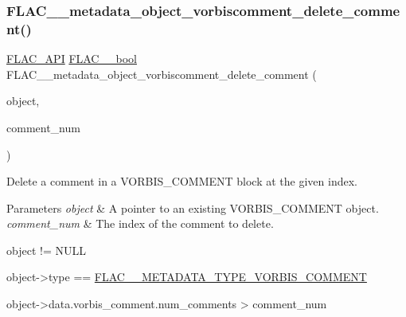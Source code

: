 \subsubsection{\texorpdfstring{F\+L\+A\+C\+\_\+\+\_\+metadata\+\_\+object\+\_\+vorbiscomment\+\_\+delete\+\_\+comment()}{FLAC\_\_metadata\_object\_vorbiscomment\_delete\_comment()}}
{\footnotesize\ttfamily \hyperlink{group__flac__export_ga56ca07df8a23310707732b1c0007d6f5}{F\+L\+A\+C\+\_\+\+A\+PI} \hyperlink{ordinals_8h_a95103469f1cbd78b8cf250194985b34e}{F\+L\+A\+C\+\_\+\+\_\+bool} F\+L\+A\+C\+\_\+\+\_\+metadata\+\_\+object\+\_\+vorbiscomment\+\_\+delete\+\_\+comment (\begin{DoxyParamCaption}\item[{\hyperlink{struct_f_l_a_c_____stream_metadata}{F\+L\+A\+C\+\_\+\+\_\+\+Stream\+Metadata} $\ast$}]{object,  }\item[{unsigned}]{comment\+\_\+num }\end{DoxyParamCaption})}

Delete a comment in a V\+O\+R\+B\+I\+S\+\_\+\+C\+O\+M\+M\+E\+NT block at the given index.


\begin{DoxyParams}{Parameters}
{\em object} & A pointer to an existing V\+O\+R\+B\+I\+S\+\_\+\+C\+O\+M\+M\+E\+NT object. \\
\hline
{\em comment\+\_\+num} & The index of the comment to delete.  
\begin{DoxyCode}
\textcolor{keywordtype}{object} != NULL 
\end{DoxyCode}
 
\begin{DoxyCode}
\textcolor{keywordtype}{object}->type == \hyperlink{group__flac__format_ggac71714ba8ddbbd66d26bb78a427fac01ad013576bc5196b907547739518605520}{FLAC\_\_METADATA\_TYPE\_VORBIS\_COMMENT} 
\end{DoxyCode}
 
\begin{DoxyCode}
\textcolor{keywordtype}{object}->data.vorbis\_comment.num\_comments > comment\_num 
\end{DoxyCode}
 \\
\hline
\end{DoxyParams}


